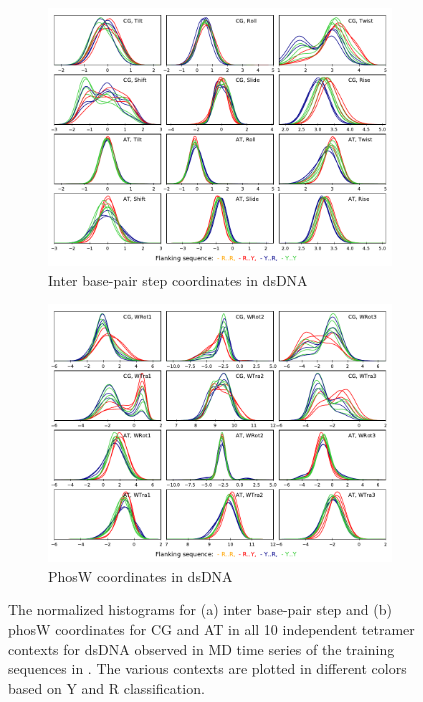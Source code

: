 \begin{figure}[H]
  \begin{subfigure}{15cm}
    \centering\includegraphics[width=15cm,trim=0cm 0cm 0cm 0.6cm]{images/DNA_inter_CG_AT.pdf}
    \caption{Inter base-pair step coordinates in dsDNA}
  \end{subfigure}
  \begin{subfigure}{15cm}
    \centering\includegraphics[width=15cm]{images/DNA_phosW_CG_AT.pdf}
    \caption{PhosW coordinates in dsDNA}
  \end{subfigure}
\caption{The normalized histograms for (a) inter base-pair step and (b) phosW coordinates for CG and AT in all 10 independent tetramer contexts for dsDNA observed in MD time series of the training sequences in \Lbdna. The various contexts are plotted in different colors based on Y and R classification.  
}
\label{c3:fig_distr_2}
\end{figure}



